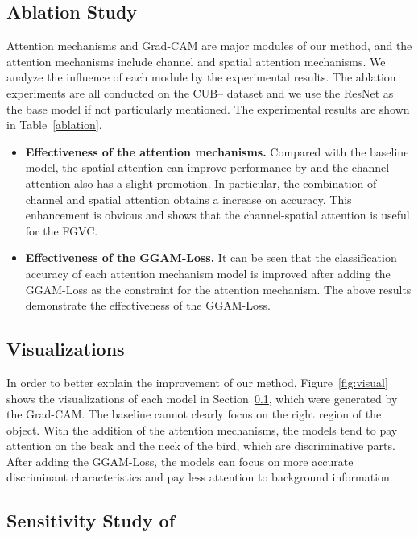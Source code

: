 \documentclass{article}
\begin{document}
\subsection{Ablation Study}\label{ssec:ablation}

Attention mechanisms and Grad-CAM are major modules of our method, and the attention mechanisms include channel and spatial attention mechanisms. We analyze the influence of each module by the experimental results. The ablation experiments are all conducted on the CUB-- dataset and we use the ResNet
as the base model if not particularly mentioned. The experimental results are shown in Table~\ref{ablation}.
\vspace{-1mm}
\begin{itemize}
    \item \textbf{Effectiveness of the attention mechanisms.} Compared with the baseline model, the spatial attention can improve performance by  and the channel attention also has a slight promotion. In particular, the combination of channel and spatial attention obtains a  increase on accuracy. This enhancement is obvious and shows that the channel-spatial attention is useful for the FGVC.
  
    \item \textbf{Effectiveness of the GGAM-Loss.} It can be seen that the classification accuracy of  each attention mechanism model is improved after adding the GGAM-Loss as the constraint for the attention mechanism. The above results demonstrate the effectiveness of the GGAM-Loss.
\end{itemize}

\subsection{Visualizations}


In order to better explain the improvement of our method, Figure~\ref{fig:visual} shows the visualizations of each model in Section~\ref{ssec:ablation}, which were generated by the Grad-CAM. The baseline cannot clearly focus on the right region of the object. With the addition of the attention mechanisms, the models tend to pay attention on the beak and the neck of the bird, which are discriminative parts. After adding the GGAM-Loss, the models can focus on more accurate discriminant characteristics and pay less attention to background information.

\subsection{Sensitivity Study of }
\end{document}
